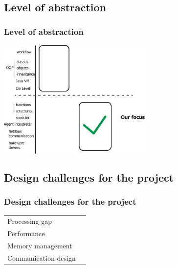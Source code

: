 \documentclass{beamer}
\theoremstyle{definition} \newtheorem{mdefinition}{Definition}
\theoremstyle{plain} \newtheorem{mtheorem}{Theorem}
\theoremstyle{plain} \newtheorem{mcorollary}{Corollary}
\theoremstyle{plain} \newtheorem{mfact}{Fact}
\begin{document}
\subsection{Level of abstraction}
\begin{frame}
\frametitle{Level of abstraction}
\begin{centering}
\includegraphics[width=3in]{img/abstraction-3}
\end{centering}
\end{frame}

\subsection{Design challenges for the project}
\begin{frame}
\frametitle{Design challenges for the project}
\begin{tabular}{ll}
Processing gap & \\

Performance & \\

Memory management & \\

Communication design & \\
\end{tabular}

\end{frame}
\end{document}
